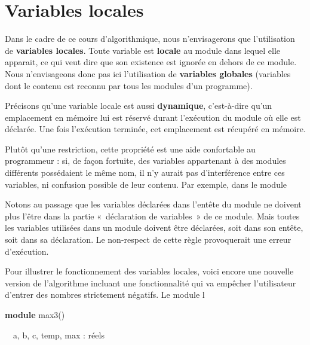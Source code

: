 \section[Variables locales]{\bfseries Variables locales}
{
{Dans le cadre de ce cours d’algorithmique, nous
n’envisagerons que l’utilisation de
}{\textbf{variables
locales}}{. Toute variable est
}{\textbf{locale}}{ au
module dans lequel elle apparait, ce qui veut dire que son existence
est ignorée en dehors de ce module. Nous n’envisageons donc pas ici
l’utilisation de }{\textbf{variables
globales}}{ (variables dont le contenu est
reconnu par tous les modules d’un programme). }}

{
Précisons qu'une variable locale est aussi
\textbf{dynamique}, c’est-à-dire qu’un emplacement en mémoire lui est
réservé durant l’exécution du module où elle est déclarée. Une fois
l’exécution terminée, cet emplacement est récupéré en mémoire.}

{
{Plutôt qu’une restriction, cette propriété est
une aide confortable au programmeur : }{si, de
façon fortuite, des variables appartenant à des modules différents
possédaient le même nom, il n’y aurait pas d’interférence entre ces
variables, ni confusion }{possible de leur
contenu. Par exemple, dans le module
}}

{
Notons au passage que les variables déclarées dans l’entête du module ne
doivent plus l’être dans la partie «~déclaration de variables~» de ce
module. Mais toutes les variables utilisées dans un module doivent être
déclarées, soit dans son entête, soit dans sa déclaration. Le
non-respect de cette règle provoquerait une erreur d’exécution.}

{
{Pour illustrer le fonctionnement des variables
locales, voici encore une nouvelle version de l’algorithme incluant une
fonctionnalité qui va empêcher l’utilisateur d’entrer des nombres
strictement négatifs. Le module
l}}

{\sffamily
\textbf{module} max3()}

{\sffamily
\ \ a, b, c, temp, max : réels}

{\sffamily
{}}

